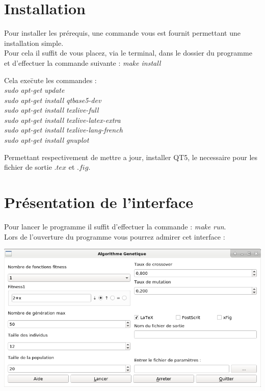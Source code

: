 \documentclass[a4paper,11pt]{article}
\title{\vspace{13em}{\huge Manuel d'utilisation}}
\author{Edouard Fouassier - Maxime Gonthier - Benjamin Guillot\\
		Laureline Martin - Rémi Navarro - Lydia Rodrigez de la Nava
		\vspace{2em}\\
		Algorithme Génétique
		\vspace{2em}}
\begin{document}
\clearpage{}
	\maketitle\vspace{13em}
\newpage
\tableofcontents
\newpage\clearpage

\section{Installation}
Pour installer les prérequis, une commande vous est fournit permettant une installation simple.\\
Pour cela il suffit de vous placez, via le terminal, dans le dossier du programme \\
et d'effectuer la commande suivante : \textit{make install}\\
\begin{tabbing}
Cela exe\=cute les commandes :\\
		\>\textit{sudo apt-get update}\\
		\>\textit{sudo apt-get install qtbase5-dev}\\
		\>\textit{sudo apt-get install texlive-full}\\
		\>\textit{sudo apt-get install texlive-latex-extra}\\
		\>\textit{sudo apt-get install texlive-lang-french}\\
		\>\textit{sudo apt-get install gnuplot}\\
\end{tabbing}
Permettant respectivement de mettre a jour, installer QT5, le necessaire pour les fichier de sortie $.tex$ et $.fig$.\\


\section{Présentation de l'interface}
Pour lancer le programme il suffit d'effectuer la commande : \textit{make run}.\\
Lors de l'ouverture du programme vous pourrez admirer cet interface :\\
\centerline{\includegraphics[scale = 0.5]{screen1.png}}
\end{document}
